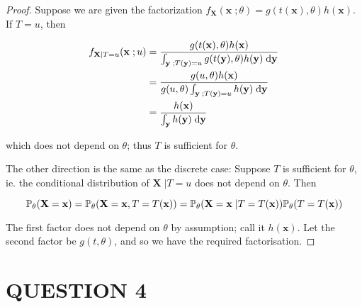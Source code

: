 \documentclass[a4paper]{article}
\begin{document}
\begin{proof}
	Suppose we are given the factorization $ f_{\mathbf{X}}(\mathbf{x} \; ; \theta) = g(t(\mathbf{x}), \theta) h(\mathbf{x}) $. If $ T = u $, then
	
	\begin{align*}
	f_{\mathbf{X}| T = u}(\mathbf{x} \; ; u) & = \frac{ g(t(\mathbf{x}), \theta) h(\mathbf{x})}{\int_{\mathbf{y} \; ; T(\mathbf{y}) = u} g(t(\mathbf{y}),\theta) h(\mathbf{y}) \; \d \mathbf{y}} \\
	& = \frac{ g(u, \theta) h(\mathbf{x})}{ g(u,\theta)   \int_{\mathbf{y} \; ; T(\mathbf{y}) = u}  h(\mathbf{y}) \; \d \mathbf{y}} \\
	& = \frac{h(\mathbf{x})}{ \int_{\mathbf{y}}  h(\mathbf{y}) \; \d \mathbf{y}}
	\end{align*}
	
	
	which does not depend on $ \theta $; thus $ T $ is sufficient for $ \theta $.
	
	The other direction is the same as the discrete case: Suppose $ T $ is sufficient for $ \theta $, ie. the conditional distribution of $ \mathbf{X} \; | T = u $ does not depend on $ \theta $. Then
	
	\[ \P_{\theta}( \mathbf{X} = \mathbf{x}) = \P_{\theta}( \mathbf{X} = \mathbf{x}, T = T(\mathbf{x})) = \P_{\theta} (\mathbf{X} = \mathbf{x} \; | T = T(\mathbf{x})) \P_{\theta}(T = T(\mathbf{x}) )  \]
	
	The first factor does not depend on $ \theta $ by assumption; call it $ h(\mathbf{x}) $. Let the second factor be $ g(t,\theta) $, and so we have the required factorisation. 
	
\end{proof}

 





\section{QUESTION 4}
\end{document}
